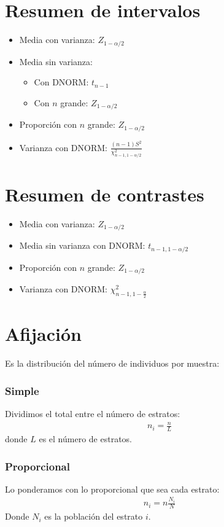\documentclass{article}
\begin{document}
\section{Resumen de intervalos}
\begin{itemize}
	\item Media con varianza: $Z_{1-\alpha / 2}$
	\item Media sin varianza:
		\begin{itemize}
			\item Con DNORM: $t_{n-1}$
			\item Con $n$ grande: $Z_{1-\alpha / 2}$  
		\end{itemize}
	\item Proporción con $n$ grande: $Z_{1-\alpha / 2}$
	\item Varianza con DNORM: $ \frac{(n-1)S^{2}}{\chi^{2}_{n-1, 1-\alpha / 2}}$
\end{itemize}
\section{Resumen de contrastes}
\begin{itemize}
	\item Media con varianza: $Z_{1-\alpha / 2}$
	\item Media sin varianza con DNORM: $t_{n-1, 1-\alpha / 2}$
	\item Proporción con $n$ grande: $Z_{1-\alpha / 2}$
	\item Varianza con DNORM: $\chi^{2}_{n-1,1-\frac{\alpha}{2}}$ 
\end{itemize}
\section{Afijación}
Es la distribución del número de individuos por muestra:
\subsubsection{Simple}
Dividimos el total entre el número de estratos:
\begin{equation}
    \begin{split}
        n_{i} = \frac{n}{L}
    \end{split}
\end{equation}
donde $L$ es el número de estratos.
\subsubsection{Proporcional}
Lo ponderamos con lo proporcional que sea cada estrato:
\begin{equation}
    \begin{split}
        n_{i} = n \frac{N_{i}}{N}
    \end{split}
\end{equation}
Donde $N_{i}$ es la población del estrato $i$.
\end{document}

